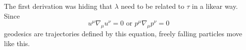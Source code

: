 The first derivation was hiding that $ \lambda $ need to be related to $\tau $ in a likear way. Since
\begin{equation}
u^{\mu }\nabla _{\mu }u^{\nu } = 0 \text{ or  } p^{\mu }\nabla _{\mu }p^{\nu } = 0
\end{equation}
geodesics are trajectories defined by this equation, freely falling particles move like this.

































